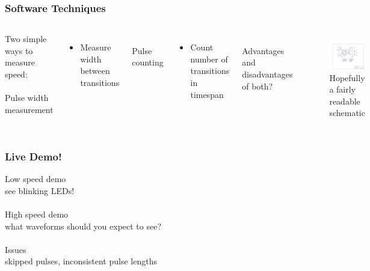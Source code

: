 \documentclass{beamer}
\begin{document}
\begin{frame}
\frametitle{Software Techniques}
\begin{columns}[t]
Two simple ways to measure speed: \\
\hfill \\
Pulse width measurement
\begin{itemize}
  \item Measure width between transitions
\end{itemize} 

\hfill \\
Pulse counting
\begin{itemize}
  \item Count number of transitions in timespan
\end{itemize}

\hfill \\
Advantages and disadvantages of both?

\begin{figure}
  \centering
  \includegraphics[width=1.0\columnwidth]{images-dis5/mc33883-schematic} \\
  Hopefully a fairly readable schematic
\end{figure}
\end{columns}
\end{frame}

\begin{frame}
\frametitle{Live Demo!}
\centering
Low speed demo \\
{\tiny see blinking LEDs!} \\
\hfill \\
High speed demo \\
{\tiny what waveforms should you expect to see?} \\
\hfill \\
Issues \\
{\tiny skipped pulses, inconsistent pulse lengths} \\
\end{frame}
\end{document}
